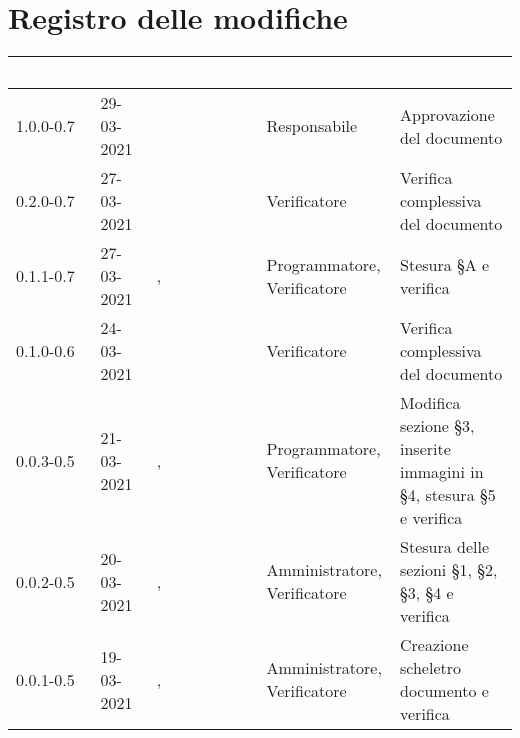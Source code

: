 \section*{Registro delle modifiche}
\setcounter{table}{-1}
{
\renewcommand{\arraystretch}{1.5}
\centering
\begin{longtable}{C{1.7cm} | C{2.2cm} | C{3.2cm} | C{3cm} | C{4.8cm}}
\textcolor{white}{\textbf{Versione}}&
\textcolor{white}{\textbf{Data}}&
\textcolor{white}{\textbf{Nominativo}}&
\textcolor{white}{\textbf{Ruolo}}&
\textcolor{white}{\textbf{Descrizione}}\\	
\endhead

1.0.0-0.7 & 29-03-2021 & \RA{} & Responsabile & Approvazione del documento \\
0.2.0-0.7 & 27-03-2021 & \BM{} & Verificatore & Verifica complessiva del documento \\
0.1.1-0.7 & 27-03-2021 & \PA{}, \SH{} & Programmatore, Verificatore & Stesura \S A e verifica \\
0.1.0-0.6 & 24-03-2021 & \ZM{} & Verificatore & Verifica complessiva del documento \\
0.0.3-0.5 & 21-03-2021 & \BM{}, \SH{} & Programmatore, Verificatore & Modifica sezione \S 3, inserite immagini in \S 4, stesura \S 5 e verifica \\
0.0.2-0.5 & 20-03-2021 & \PA{}, \SG{}   & Amministratore, Verificatore & Stesura delle sezioni \S 1, \S 2, \S 3, \S 4 e verifica \\
0.0.1-0.5 & 19-03-2021 & \SG{}, \SP{} & Amministratore, Verificatore & Creazione scheletro documento e verifica\\
		
\end{longtable}
}